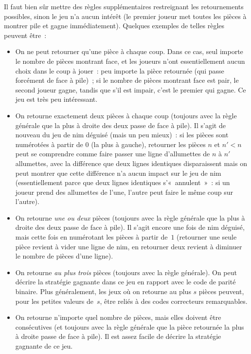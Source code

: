 \documentclass[12pt,a4paper]{article}
\theoremstyle{definition}
\begin{document}
Il faut bien sûr mettre des règles supplémentaires restreignant les
retournements possibles, sinon le jeu n'a aucun intérêt (le premier
joueur met toutes les pièces à montrer pile et gagne immédiatement).
Quelques exemples de telles règles peuvent être :
\begin{itemize}
\item On ne peut retourner qu'une pièce à chaque coup.  Dans ce cas,
  seul importe le nombre de pièces montrant face, et les joueurs n'ont
  essentiellement aucun choix dans le coup à jouer : peu importe la
  pièce retournée (qui passe forcément de face à pile) ; si le nombre
  de pièces montrant face est pair, le second joueur gagne, tandis que
  s'il est impair, c'est le premier qui gagne.  Ce jeu est très peu
  intéressant.
\item On retourne exactement deux pièces à chaque coup (toujours avec
  la règle générale que la plus à droite des deux passe de face à
  pile).  Il s'agit de nouveau du jeu de nim déguisé (mais un peu
  mieux) : si les pièces sont numérotées à partir de $0$ (la plus à
  gauche), retourner les pièces $n$ et $n'<n$ peut se comprendre comme
  faire passer une ligne d'allumettes de $n$ à $n'$ allumettes, avec
  la différence que deux lignes identiques disparaissent mais on peut
  montrer que cette différence n'a aucun impact sur le jeu de nim
  (essentiellement parce que deux lignes identiques s'« annulent » :
  si un joueur prend des allumettes de l'une, l'autre peut faire le
  même coup sur l'autre).
\item On retourne \emph{une ou deux} pièces (toujours avec la règle
  générale que la plus à droite des deux passe de face à pile).  Il
  s'agit encore une fois de nim déguisé, mais cette fois en numérotant
  les pièces à partir de $1$ (retourner une seule pièce revient à
  vider une ligne de nim, en retourner deux revient à diminuer le
  nombre de pièces d'une ligne).
\item On retourne \emph{au plus trois} pièces (toujours avec la règle
  générale).  On peut décrire la stratégie gagnante dans ce jeu en
  rapport avec le code de parité binaire.  Plus généralement, les jeux
  où on retourne au plus $s$ pièces peuvent, pour les petites valeurs
  de $s$, être reliés à des codes correcteurs remarquables.
\item On retourne n'importe quel nombre de pièces, mais elles doivent
  être consécutives (et toujours avec la règle générale que la pièce
  retournée la plus à droite passe de face à pile).  Il est assez
  facile de décrire la stratégie gagnante de ce jeu.
\end{itemize}
\end{document}
